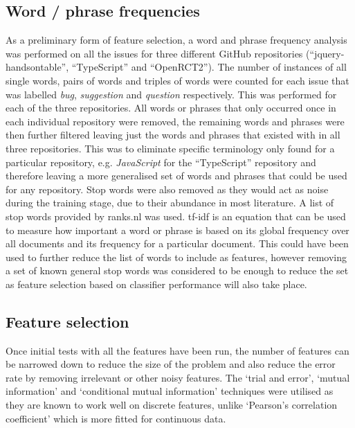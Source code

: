 \subsection{Word / phrase frequencies}
\label{sec:background_wordfreq}
As a preliminary form of feature selection, a word and phrase frequency analysis was performed on all the issues for three
different GitHub repositories (``jquery-handsontable'', ``TypeScript'' and ``OpenRCT2''). The number of instances of all single
words, pairs of words and triples of words were counted for each issue that was labelled \textit{bug}, \textit{suggestion} and
\textit{question} respectively. This was performed for each of the three repositories. All words or phrases that only occurred
once in each individual repository were removed, the remaining words and phrases were then further filtered leaving just the
words and phrases that existed with in all three repositories. This was to eliminate specific terminology only found for a
particular repository, e.g. \textit{JavaScript} for the ``TypeScript'' repository and therefore leaving a more generalised set
of words and phrases that could be used for any repository. Stop words were also removed as they would act as noise during the
training stage, due to their abundance in most literature. A list of stop words provided by ranks.nl \cite{ranks.nl} was used.
tf-idf is an equation that can be used to measure how important a word or phrase is based on its global frequency over all
documents and its frequency for a particular document. This could have been used to further reduce the list of words to include
as features, however removing a set of known general stop words was considered to be enough to reduce the set as feature
selection based on classifier performance will also take place.

\subsection{Feature selection}
Once initial tests with all the features have been run, the number of features can be narrowed down to reduce the size of the
problem and also reduce the error rate by removing irrelevant or other noisy features. The `trial and error',
`mutual information' and `conditional mutual information' techniques were utilised as they are known to work well on discrete
features, unlike `Pearson's correlation coefficient' which is more fitted for continuous data.

